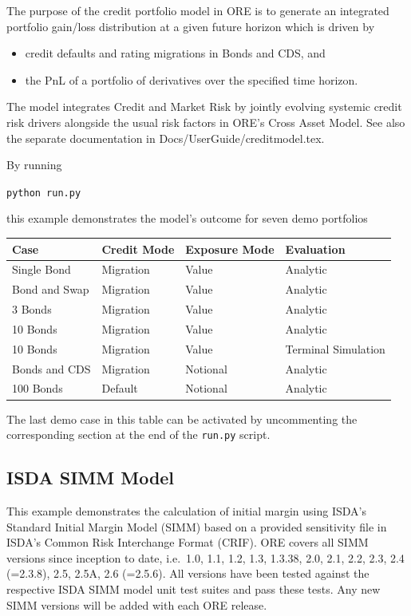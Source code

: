 \documentclass[12pt, a4paper]{article}
\begin{document}
The purpose of the credit portfolio model in ORE is to generate an integrated portfolio gain/loss distribution at a given future horizon which is driven by 
\begin{itemize}
\item credit defaults and rating migrations in Bonds and CDS, and 
\item the PnL of a portfolio of derivatives over the specified time horizon.
\end{itemize}
The model integrates Credit and Market Risk by jointly evolving systemic credit risk drivers alongside the usual risk factors in ORE's Cross Asset Model.
See also the separate documentation in Docs/UserGuide/creditmodel.tex.

By running \\
\medskip
\centerline{{\tt python run.py}} 

\medskip
this example demonstrates the model's outcome for seven demo portfolios

\begin{center}
\begin{tabular}{|l|l|l|l|}
\hline
Case & Credit Mode & Exposure Mode & Evaluation \\
\hline
\hline
Single Bond & Migration & Value & Analytic \\
\hline
Bond and Swap & Migration & Value & Analytic \\
\hline
3 Bonds & Migration & Value & Analytic \\
\hline
10 Bonds & Migration & Value & Analytic \\
\hline
10 Bonds & Migration & Value & Terminal Simulation \\
\hline
Bonds and CDS & Migration & Notional & Analytic \\
\hline
100 Bonds & Default & Notional & Analytic \\
\hline
\end{tabular}
\end{center}
The last demo case in this table can be activated by uncommenting the corresponding section at the end of the {\tt run.py} script.
 
\subsection{ISDA SIMM Model}%
\label{example:44}

This example demonstrates the calculation of initial margin using ISDA's Standard Initial Margin Model (SIMM) based on a provided 
sensitivity file in ISDA's Common Risk Interchange Format (CRIF).
ORE covers all SIMM versions since inception to date, i.e.\ 1.0, 1.1, 1.2, 1.3, 1.3.38, 2.0, 2.1, 2.2, 2.3, 2.4 (=2.3.8), 2.5, 2.5A, 2.6 (=2.5.6).
All versions have been tested against the respective ISDA SIMM model unit test suites and pass these tests.
Any new SIMM versions will be added with each ORE release.
\end{document}
